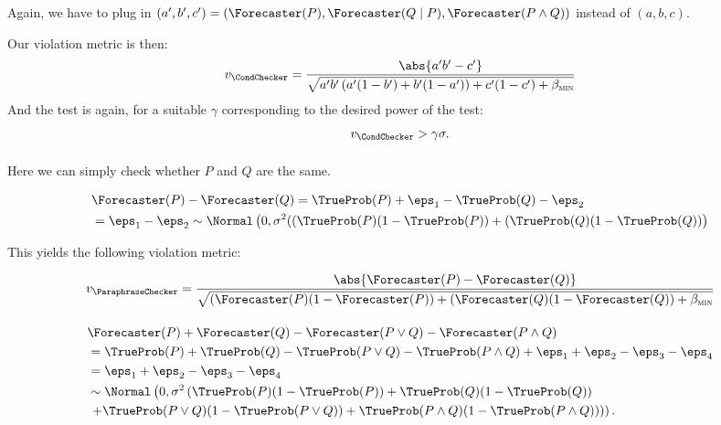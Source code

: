 Again, we have to plug in $(a', b', c') = (\Forecaster(P), \Forecaster(Q \mid P), \Forecaster(P \wedge Q))$ instead of $(a, b, c)$.

Our violation metric is then:
\begin{align*}
    v_{\CondChecker}
    = \frac{\abs{a'b' - c'}}{
        \sqrt{a'b' \left( a'(1-b') + b'(1-a') \right) + c'(1-c')+ \betamin}
    }
\end{align*}
And the test is again, for a suitable $\gamma$ corresponding to the desired power of the test:
\begin{align*}
    v_{\CondChecker} > \gamma \sigma.
\end{align*}


\paragraph{\ParaphraseChecker}

Here we can simply check whether $P$ and $Q$ are the same.

\begin{align*}
   &\Forecaster(P) - \Forecaster(Q)
   = \TrueProb(P) + \eps_1 - \TrueProb(Q) - \eps_2 \\
   &= \eps_1 - \eps_2 \sim \Normal\left(0, \sigma^2 ((\TrueProb(P)(1 - \TrueProb(P)) + (\TrueProb(Q)(1 - \TrueProb(Q)) \right)
\end{align*}

This yields the following violation metric:

\begin{align*}
    v_{\ParaphraseChecker}
    = \frac{\abs{\Forecaster(P) - \Forecaster(Q)}}{
        \sqrt{(\Forecaster(P)(1 - \Forecaster(P)) + (\Forecaster(Q)(1 - \Forecaster(Q))+ \betamin}
    }
\end{align*}

\paragraph{\AndOrChecker}

\begin{align*}
   &\Forecaster(P) + \Forecaster(Q) - \Forecaster(P \lor Q) - \Forecaster(P \land Q) \\
   & =
   \TrueProb(P) + \TrueProb(Q) - \TrueProb(P \lor Q) - \TrueProb(P \land Q) + \eps_1 + \eps_2 - \eps_3 - \eps_4 \\
   &= \eps_1 + \eps_2 - \eps_3 - \eps_4 \\
   &\sim \Normal\left(0, \sigma^2 \left( \TrueProb(P)(1 - \TrueProb(P)) + \TrueProb(Q)(1 - \TrueProb(Q)) \right. \right. \\
   &\left. \left. + \TrueProb(P \lor Q)(1 - \TrueProb(P \lor Q)) + \TrueProb(P \land Q)(1 - \TrueProb(P \land Q)) \right) \right).
\end{align*}

